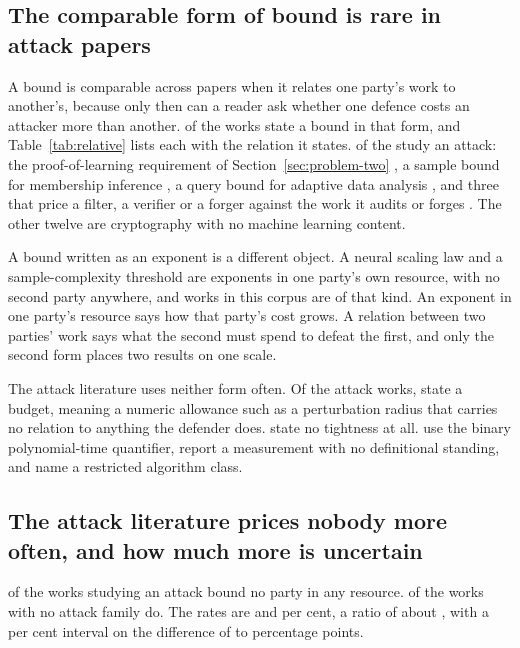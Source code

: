 \subsection{The comparable form of bound is rare in attack papers}

A bound is comparable across papers when it relates one party's work to
another's, because only then can a reader ask whether one defence costs an
attacker more than another. \NumRelative{} of the \NumSources{} works state a
bound in that form, and Table~\ref{tab:relative} lists each with the relation
it states. \NumRelativeAttack{} of the \NumRelative{} study an attack: the
proof-of-learning requirement of Section~\ref{sec:problem-two}
\cite{JYCDTCP21}, a sample bound for membership inference \cite{HSU25}, a query
bound for adaptive data analysis \cite{HU14}, and three that price a filter, a
verifier or a forger against the work it audits or forges
\cite{BGGKRR26,NK26,ZCSL24}. The other twelve are cryptography with no machine
learning content.



A bound written as an exponent is a different object. A neural scaling law and
a sample-complexity threshold are exponents in one party's own resource, with
no second party anywhere, and \NumExponent{} works in this corpus are of that
kind. An exponent in one party's resource says how that party's cost grows. A
relation between two parties' work says what the second must spend to defeat
the first, and only the second form places two results on one scale.

The attack literature uses neither form often. Of the \NumAttackWorks{} attack
works, \AttackBudget{} state a budget, meaning a numeric allowance such as a
perturbation radius that carries no relation to anything the defender does.
\AttackUnstated{} state no tightness at all. \AttackPoly{} use the binary
polynomial-time quantifier, \AttackMeasured{} report a measurement with no
definitional standing, and \AttackClass{} name a restricted algorithm class.

\subsection{The attack literature prices nobody more often, and how much more is uncertain}

\AttackUnbound{} of the \NumAttackWorks{} works studying an attack bound no
party in any resource. \TheoryUnbound{} of the \NumTheoryWorks{} works with no
attack family do. The rates are \RateAttack{} and \RateOther{} per cent, a
ratio of about \RatioUnbound{}, with a \ConfLevel{} per cent interval on the
difference of \DiffLo{} to \DiffHi{} percentage points.

